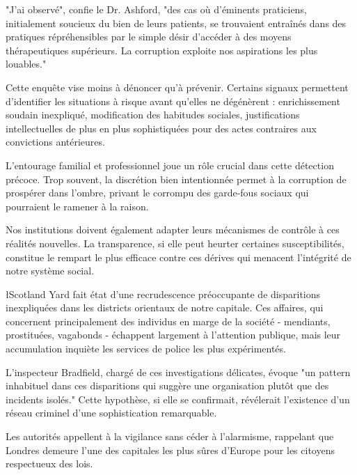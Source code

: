 \documentclass{news}
\begin{document}
"J'ai observé", confie le Dr. Ashford, "des cas où d'éminents praticiens, initialement soucieux du bien de leurs patients, se trouvaient entraînés dans des pratiques répréhensibles par le simple désir d'accéder à des moyens thérapeutiques supérieurs. La corruption exploite nos aspirations les plus louables."

Cette enquête vise moins à dénoncer qu'à prévenir. Certains signaux permettent d'identifier les situations à risque avant qu'elles ne dégénèrent : enrichissement soudain inexpliqué, modification des habitudes sociales, justifications intellectuelles de plus en plus sophistiquées pour des actes contraires aux convictions antérieures.

L'entourage familial et professionnel joue un rôle crucial dans cette détection précoce. Trop souvent, la discrétion bien intentionnée permet à la corruption de prospérer dans l'ombre, privant le corrompu des garde-fous sociaux qui pourraient le ramener à la raison.

Nos institutions doivent également adapter leurs mécanismes de contrôle à ces réalités nouvelles. La transparence, si elle peut heurter certaines susceptibilités, constitue le rempart le plus efficace contre ces dérives qui menacent l'intégrité de notre système social.


\l{S}cotland Yard fait état d'une recrudescence préoccupante de disparitions inexpliquées dans les districts orientaux de notre capitale. Ces affaires, qui concernent principalement des individus en marge de la société - mendiants, prostituées, vagabonds - échappent largement à l'attention publique, mais leur accumulation inquiète les services de police les plus expérimentés.

L'inspecteur Bradfield, chargé de ces investigations délicates, évoque "un pattern inhabituel dans ces disparitions qui suggère une organisation plutôt que des incidents isolés." Cette hypothèse, si elle se confirmait, révélerait l'existence d'un réseau criminel d'une sophistication remarquable.

Les autorités appellent à la vigilance sans céder à l'alarmisme, rappelant que Londres demeure l'une des capitales les plus sûres d'Europe pour les citoyens respectueux des lois.
\end{document}
